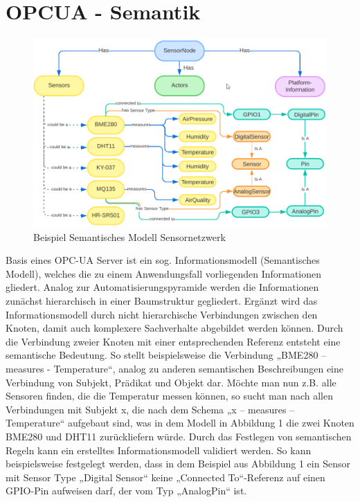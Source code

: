 \section{OPCUA - Semantik}\label{ch:opcua}

\begin{figure}[thpb]
      \centering
      \includegraphics[scale=0.55]{abbildungen/opcua_semantic_schema.png}
      \caption{Beispiel Semantisches Modell Sensornetzwerk}
\end{figure}
Basis eines OPC-UA Server ist ein sog. Informationsmodell (Semantisches Modell), welches die zu einem Anwendungsfall vorliegenden Informationen gliedert. Analog zur Automatisierungspyramide werden die Informationen zunächst hierarchisch in einer Baumstruktur gegliedert. Ergänzt wird das Informationsmodell durch nicht hierarchische Verbindungen zwischen den Knoten, damit auch komplexere Sachverhalte abgebildet werden können.
\newline
\newline
Durch die Verbindung zweier Knoten mit einer entsprechenden Referenz entsteht eine semantische Bedeutung. So stellt beispielsweise die Verbindung „BME280 – measures - Temperature“, analog zu anderen semantischen Beschreibungen eine Verbindung von Subjekt, Prädikat und Objekt dar. Möchte man nun z.B. alle Sensoren finden, die die Temperatur messen können, so sucht man nach allen Verbindungen mit Subjekt x, die nach dem Schema „x – measures – Temperature“ aufgebaut sind, was in dem Modell in Abbildung 1 die zwei Knoten BME280 und DHT11 zurückliefern würde.
\newline
\newline
Durch das Festlegen von semantischen Regeln kann ein erstelltes Informationsmodell validiert werden. So kann beispielsweise festgelegt werden, dass in dem Beispiel aus Abbildung 1 ein Sensor mit Sensor Type „Digital Sensor“ keine „Connected To“-Referenz auf einen GPIO-Pin aufweisen darf, der vom Typ „AnalogPin“ ist.
